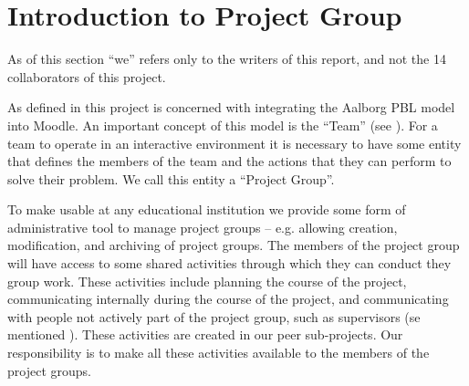 \chapter{Introduction to Project Group}
\label{chap:introProjectgroup}

As of this section ``we'' refers only to the writers of this report, and not the 14 collaborators of this project.

As defined in  this project is concerned with integrating the Aalborg PBL model into Moodle.
An important concept of this model is the ``Team'' (see ).
For a team to operate in an interactive environment it is necessary to have some entity that defines the members of the team and the actions that they can perform to solve their problem.
We call this entity a ``Project Group''.

To make \system{} usable at any educational institution we provide some form of administrative tool to manage project groups -- e.g. allowing  creation, modification, and archiving of project groups.
The members of the project group will have access to some shared activities through which they can conduct they group work.
These activities include planning the course of the project, communicating internally during the course of the project, and communicating with people not actively part of the project group, such as supervisors (se mentioned ).
These activities are created in our peer sub-projects.
Our responsibility is to make all these activities available to the members of the project groups.
	

